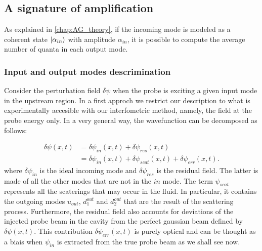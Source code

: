 \subsection{A signature of amplification}
As explained in \autoref{chap:AG_theory}, if the incoming mode is modeled as a coherent state $\ket{\alpha_{in}}$ with amplitude $\alpha_{in}$, it is possible to compute the average number of quanta in each output mode.

\subsubsection{Input and output modes descrimination}
Consider the perturbation field $\delta\psi$ when the probe is exciting a given input mode in the upstream region. In a first approch we restrict our description to 
what is experimentally accesible with our interfometric method, namely, the field at the probe energy only. In a very general way, the wavefunction can be decomposed as follows:

\begin{equation}
    \begin{aligned}
    \delta\psi(x,t) &= \delta \psi_{in}(x,t)+\delta \psi_{res}(x,t) \\
    &= \delta \psi_{in}(x,t) + \delta \psi_{scat}(x,t) + \delta \psi_{err}(x,t).
    \end{aligned}
\label{eq:scat_decomp}
\end{equation}
where $\delta \psi_{in}$ is the ideal incoming mode and $\delta \psi_{res}$ is the residual field. The latter is made of all the other modes that are not in the $in$ mode. The term $\psi_{scat}$ represents all the scaterings that may 
occur in the fluid. In particular, it contains the outgoing modes $u_{out}$, $d_1^{out}$ and $d_2^{out}$ that are the result of the scattering process. Furthermore, the residual field also accounts for deviations
of the injected probe beam in the cavity from the perfect gaussian beam defined by $\delta \psi(x,t)$. This contribution $\delta \psi_{err}(x,t)$ is purely optical and can be thought as a biais when $\psi_{in}$ is extracted from the true probe beam as we shall see now.

\bigskip

